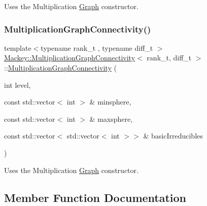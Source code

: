 Uses the Multiplication \hyperlink{classMackey_1_1Graph}{Graph} constructor. 

\mbox{\label{classMackey_1_1MultiplicationGraphConnectivity_a7e902dcb12c7731f335b38d65a5d9ab3}} 
\subsubsection{\texorpdfstring{Multiplication\+Graph\+Connectivity()}{MultiplicationGraphConnectivity()}\hspace{0.1cm}{\footnotesize\ttfamily [2/2]}}
{\footnotesize\ttfamily template$<$typename rank\+\_\+t , typename diff\+\_\+t $>$ \\
\hyperlink{classMackey_1_1MultiplicationGraphConnectivity}{Mackey\+::\+Multiplication\+Graph\+Connectivity}$<$ rank\+\_\+t, diff\+\_\+t $>$\+::\hyperlink{classMackey_1_1MultiplicationGraphConnectivity}{Multiplication\+Graph\+Connectivity} (\begin{DoxyParamCaption}\item[{int}]{level,  }\item[{const std\+::vector$<$ int $>$ \&}]{minsphere,  }\item[{const std\+::vector$<$ int $>$ \&}]{maxsphere,  }\item[{const std\+::vector$<$ std\+::vector$<$ int $>$$>$ \&}]{basic\+Irreducibles }\end{DoxyParamCaption})\hspace{0.3cm}{\ttfamily [inline]}}



Uses the Multiplication \hyperlink{classMackey_1_1Graph}{Graph} constructor. 



\subsection{Member Function Documentation}
\mbox{\label{classMackey_1_1MultiplicationGraphConnectivity_a81e8f3efb867ea951573a2a5ca5825ed}} 
